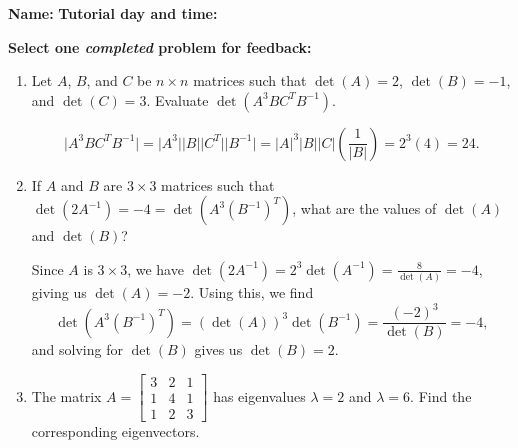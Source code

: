 \documentclass[12pt]{article}
\newcommand{\abs}[1]{\lvert #1\rvert}
\newcommand{\bbm}{\begin{bmatrix}}
\newcommand{\ebm}{\end{bmatrix}}
\begin{document}
{\bf \large Name:} \hspace{2.5in} {\bf Tutorial day and time:}

\bigskip

{\bf Select {\bf one} {\em completed} problem for feedback:}

\bigskip


\thispagestyle{fancy}
 \begin{enumerate}
\item Let $A$, $B$, and $C$ be $n\times n$ matrices such that $\det(A) = 2$, $\det(B)=-1$, and $\det(C) = 3$. Evaluate $\det(A^3BC^TB^{-1})$.

\bigskip

\[
 \abs{A^3BC^TB^{-1}} = \abs{A^3}\abs{B}\abs{C^T}\abs{B^{-1}} = \abs{A}^3\abs{B}\abs{C}\left(\frac{1}{\abs{B}}\right) = 2^3(4) = 24.
\]

\bigskip

\item If $A$ and $B$ are $3\times 3$ matrices such that $\det(2A^{-1}) = -4 = \det(A^3(B^{-1})^T)$, what are the values of $\det(A)$ and $\det(B)$?

\bigskip

Since $A$ is $3\times 3$, we have $\det(2A^{-1}) = 2^3\det(A^{-1}) = \frac{8}{\det(A)} = -4$, giving us $\det(A) = -2$. Using this, we find
\[
 \det(A^3(B^{-1})^T) = (\det(A))^3\det(B^{-1}) = \frac{(-2)^3}{\det(B)} = -4,
\]
and solving for $\det(B)$ gives us $\det(B) = 2$.

\bigskip

\item The matrix $A = \bbm 3&2&1\\1&4&1\\1&2&3\ebm$ has eigenvalues $\lambda=2$ and $\lambda=6$. Find the corresponding eigenvectors.

\bigskip


\end{enumerate}
\end{document}
